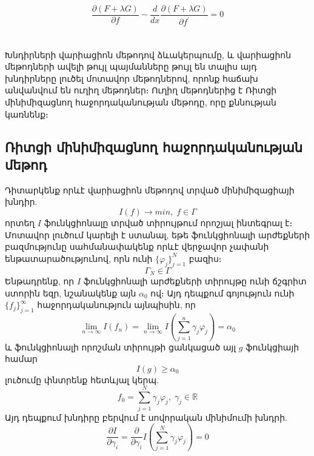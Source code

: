 \documentclass[fleqn, bachelor,subf,12pt,notitlepage]{article}
\begin{document}
$$\dfrac{\partial \left(F+\lambda G\right)}{\partial f} - \dfrac{d}{dx} \dfrac{\partial \left(F+\lambda G\right)}{\partial f^{'}} = 0$$


\newpage


\section*{}
\setcounter{equation}{0}
Խնդիրների վարիացիոն մեթոդով ձևակերպումը, և վարիացիոն մեթոդների ավելի թույլ պայմանները թույլ են տալիս այդ խնդիրները լուծել մոտավոր մեթոդներով, որոնք հաճախ անվանվում են ուղիղ մեթոդներ։ Ուղիղ մեթոդներից է Ռիտցի մինիմիզացնող հաջորդականության մեթոդը, որը քննության կառնենք։ 

\subsection*{{Ռիտցի մինիմիզացնող հաջորդականության մեթոդ}}
Դիտարկենք որևէ վարիացիոն մեթոդով տրված մինիմիզացիայի խնդիր.
		$$I\left(f\right) \longrightarrow min, \; f \in \Gamma$$
որտեղ $I$ ֆունկցիոնալը տրված տիրույթում որոշյալ ինտեգրալ է։
Մոտավոր լուծում կարելի է ստանալ, եթե ֆունկցիոնալի արժեքների բազմությունը սահմանափակենք որևէ վերջավոր չափանի ենթատարածությունով, որն ունի $\{\varphi_{j}\}_{j=1}^{N}$ բազիս։
			  $$\Gamma_{N} \in \Gamma $$
Ենթադրենք, որ $I$ ֆունկցիոնալի արժեքների տիրույթը ունի ճշգրիտ ստորին եզր, նշանակենք այն $\alpha_{0}$ ով։
Այդ դեպքում գոյություն ունի $\{f_{j}\}_{j=1}^{\infty}$ հաջորդականություն այնպիսին, որ
\begin{equation}
\lim_{n \to \infty}I\left(f_{n}\right) = \lim_{n \to \infty}I\left( \sum_{j=1}^{n} \gamma_{j}\varphi_{j} \right) = \alpha_{0}
\end{equation}
և ֆունկցիոնալի որոշման տիրույթի ցանկացած այլ $g$ ֆունկցիայի համար
			$$I\left(g\right) \geq \alpha_{0}$$
լուծումը փնտրենք հետևյալ կերպ.
\begin{equation}
f_{0}=\sum_{j=1}^{N}\gamma_{j}\varphi_{j}, \; \gamma_{j} \in \mathbb{R}
\end{equation}
Այդ դեպքում խնդիրը բերվում է սովորական մինիմումի խնդրի.
\begin{equation}
\dfrac{\partial I}{\partial \gamma_{i}} = \dfrac{\partial}{\partial \gamma_{i}} I \left(\sum_{j=1}^{N}\gamma_{j}\varphi_{j}\right) = 0
\end{equation}
\newpage
\end{document}
